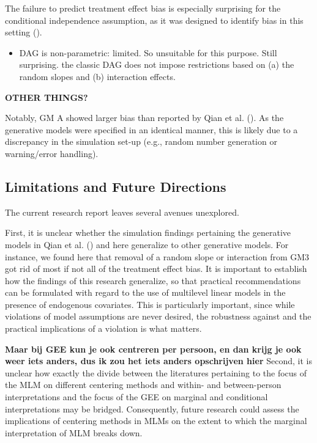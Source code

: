 \documentclass[
  11pt,
  a4paper,
]{article}
\providecommand{\tightlist}{%
  \setlength{\itemsep}{0pt}\setlength{\parskip}{0pt}}\usepackage{longtable,booktabs,array}
\begin{document}
The failure to predict treatment effect bias is especially surprising
for the conditional independence assumption, as it was designed to
identify bias in this setting ().

\begin{itemize}
\tightlist
\item
  DAG is non-parametric: limited. So unsuitable for this purpose. Still
  surprising. the classic DAG does not impose restrictions based on (a)
  the random slopes and (b) interaction effects.
\end{itemize}

\textbf{OTHER THINGS?}

Notably, GM A showed larger bias than reported by Qian et al.
(). As the generative models were specified
in an identical manner, this is likely due to a discrepancy in the
simulation set-up (e.g., random number generation or warning/error
handling).

\subsection{Limitations and Future
Directions}\label{limitations-and-future-directions}

The current research report leaves several avenues unexplored.

First, it is unclear whether the simulation findings pertaining the
generative models in Qian et al. () and
here generalize to other generative models. For instance, we found here
that removal of a random slope or interaction from GM3 got rid of most
if not all of the treatment effect bias. It is important to establish
how the findings of this research generalize, so that practical
recommendations can be formulated with regard to the use of multilevel
linear models in the presence of endogenous covariates. This is
particularly important, since while violations of model assumptions are
never desired, the robustness against and the practical implications of
a violation is what matters.

\textbf{Maar bij GEE kun je ook centreren per persoon, en dan krijg je
ook weer iets anders, dus ik zou het iets anders opschrijven hier}
Second, it is unclear how exactly the divide between the literatures
pertaining to the focus of the MLM on different centering methods and
within- and between-person interpretations and the focus of the GEE on
marginal and conditional interpretations may be bridged. Consequently,
future research could assess the implications of centering methods in
MLMs on the extent to which the marginal interpretation of MLM breaks
down.
\end{document}

